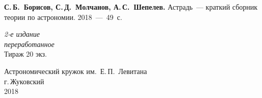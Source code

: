\setcounter{page}{1}
\thispagestyle{empty}
\vspace*{1cm}
{\hspace{1pc} {\bfseries С.\,Б.~Борисов, С.\,Д.~Молчанов, А.\,С.~Шепелев.} Астрадь~--- краткий сборник теории по астрономии. 2018~---~49~с.} 
\vskip3cm
\begin{center}
	{\slshape 2-е издание\\
	переработанное}\\[5mm]
	\small  Тираж 20 экз.
\end{center}
\vskip5cm
\begin{center}
Астрономический кружок им.~Е.\,П.~Левитана\\[3mm]
г.\,Жуковский\\[1cm]
	2018
\end{center}
\newpage
